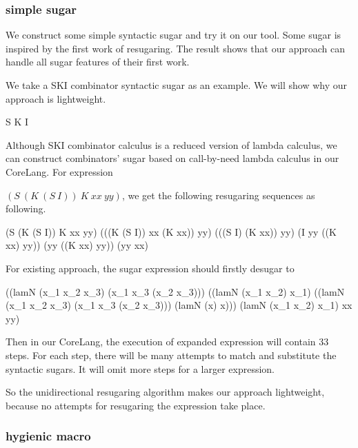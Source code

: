 \subsubsection{simple sugar}
\label{mark:simple}

We construct some simple syntactic sugar and try it on our tool. Some sugar is inspired by the first work of resugaring\cite{resugaring}. The result shows that our approach can handle all sugar features of their first work.

We take a SKI combinator syntactic sugar as an example. We will show why our approach is lightweight.
\begin{Codes}
	S 
	K 
	I 
\end{Codes}



Although SKI combinator calculus is a reduced version of lambda calculus, we can construct combinators' sugar based on call-by-need lambda calculus in our CoreLang. For expression

 $(S~(K~(S~I))~K~xx~yy)$, we get the following resugaring sequences as following.
\begin{Codes}
    (S (K (S I)) K xx yy)
\OneStep (((K (S I)) xx (K xx)) yy)
\OneStep (((S I) (K xx)) yy)
\OneStep (I yy ((K xx) yy))
\OneStep (yy ((K xx) yy))
\OneStep (yy xx)
\end{Codes}


For existing approach, the sugar expression should firstly desugar to
\begin{Codes}
((lamN
   (x_{1} x_{2} x_{3})
   (x_{1} x_{3} (x_{2} x_{3})))
  ((lamN (x_{1} x_{2}) x_{1})
   ((lamN
     (x_{1} x_{2} x_{3})
     (x_{1} x_{3} (x_{2} x_{3})))
    (lamN (x) x)))
  (lamN (x_{1} x_{2}) x_{1})
  xx yy)
\end{Codes}

Then in our CoreLang, the execution of expanded expression will contain 33 steps. For each step, there will be many attempts to match and substitute the syntactic sugars. It will omit more steps for a larger expression.

So the unidirectional resugaring algorithm makes our approach lightweight, because no attempts for resugaring the expression take place.
\subsubsection{hygienic macro}
\label{mark:hygienic}



